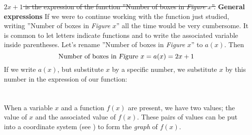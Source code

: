 \st{$ {2x+1} $ is the expression of the function ''Number of boxes in \textsl{Figure }$ x $''.}
\newpage
\textbf{General expressions} \os
If we were to continue working with the function just studied, writing ''Number of boxes in \textsl{Figure }$ x $'' all the time would be very cumbersome. It is common to let letters indicate functions and to write the associated variable inside parentheses. Let's rename ''Number of boxes in \textsl{Figure} $ x $'' to $ a(x) $. Then
\[ \text{Number of boxes in \textsl{Figure }}x=a(x)=2x+1 \]
If we write $ a(x) $, but substitute $ x $ by a specific number, we substitute $ x $ by this number in the expression of our function:
\newpage
{}
\section{\lingraf}
When a variable $ x $ and a function $ f(x)  $ are present, we have two values; the value of $ x $ and the associated value of $ f(x) $. These pairs of values can be put into a coordinate system (see ) to form the  \textit{graph} of $ f(x) $. \vsk

